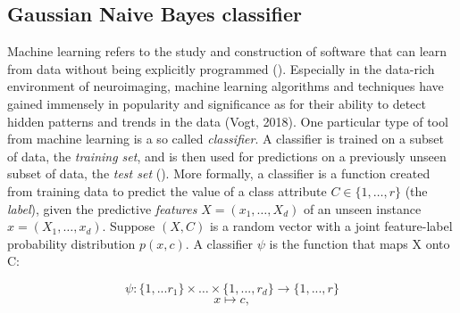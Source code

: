 \documentclass[a4paper, 12pt]{scrreprt}
\begin{document}
\subsection{Gaussian Naive Bayes classifier}
Machine learning refers to the study and construction of software that can learn from data without being explicitly programmed (\cite{zeigermann2018machine}). Especially in the data-rich environment of neuroimaging, machine learning algorithms and techniques have gained immensely in popularity and significance as for their ability to detect hidden patterns and trends in the data (Vogt, 2018). One particular type of tool from machine learning is a so called \textit{classifier}. A classifier is trained on a subset of data, the \textit{training set}, and is then used for predictions on a previously unseen subset of data, the \textit{test set} (\cite{zeigermann2018machine}). \newline
More formally, a classifier is a function created from training data to predict the value of a class attribute $C \in \{1, \ldots, r\}$ (the \textit{label}), given the predictive \textit{features} $X = (x_1, \ldots, X_d)$ of an unseen instance $x = (X_1, \ldots, x_d)$. Suppose $(X, C)$ is a random vector with a joint feature-label probability distribution $p(x, c)$. A classifier $\psi$ is the function that maps X onto C:

\begin{equation}\label{classifier}
\psi: \{1, ... r_1\} \times  \ldots \times \{1, ..., r_d\} \rightarrow \{1, ..., r\}
\end{equation}
\begin{equation}
x \mapsto c,
\end{equation}
\end{document}
